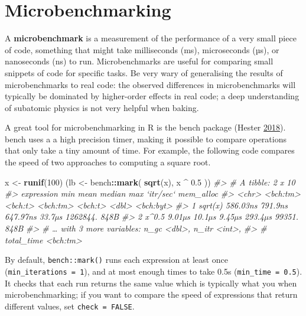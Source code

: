 \documentclass[]{book}
\newenvironment{Shaded}{\begin{snugshade}}{\end{snugshade}}
\newcommand{\CommentTok}[1]{\textcolor[rgb]{0.37,0.37,0.37}{\textit{#1}}}
\newcommand{\DecValTok}[1]{\textcolor[rgb]{0.06,0.06,0.06}{#1}}
\newcommand{\FloatTok}[1]{\textcolor[rgb]{0.06,0.06,0.06}{#1}}
\newcommand{\KeywordTok}[1]{\textcolor[rgb]{0.27,0.27,0.27}{\textbf{#1}}}
\newcommand{\NormalTok}[1]{#1}
\newcommand{\OperatorTok}[1]{\textcolor[rgb]{0.43,0.43,0.43}{\textbf{#1}}}
\newcommand{\StringTok}[1]{\textcolor[rgb]{0.5,0.5,0.5}{#1}}
\begin{document}
\hypertarget{microbenchmarking}{%
\section{Microbenchmarking}\label{microbenchmarking}}


A \textbf{microbenchmark} is a measurement of the performance of a very small piece of code, something that might take milliseconds (ms), microseconds (µs), or nanoseconds (ns) to run. Microbenchmarks are useful for comparing small snippets of code for specific tasks. Be very wary of generalising the results of microbenchmarks to real code: the observed differences in microbenchmarks will typically be dominated by higher-order effects in real code; a deep understanding of subatomic physics is not very helpful when baking.

A great tool for microbenchmarking in R is the bench package (Hester \protect\hyperlink{ref-bench}{2018}). bench uses a a high precision timer, making it possible to compare operations that only take a tiny amount of time. For example, the following code compares the speed of two approaches to computing a square root.

\begin{Shaded}
\begin{Highlighting}[]
\NormalTok{x <-}\StringTok{ }\KeywordTok{runif}\NormalTok{(}\DecValTok{100}\NormalTok{)}
\NormalTok{(lb <-}\StringTok{ }\NormalTok{bench}\OperatorTok{::}\KeywordTok{mark}\NormalTok{(}
  \KeywordTok{sqrt}\NormalTok{(x),}
\NormalTok{  x }\OperatorTok{^}\StringTok{ }\FloatTok{0.5}
\NormalTok{))}
\CommentTok{#> # A tibble: 2 x 10}
\CommentTok{#>   expression      min    mean   median     max `itr/sec` mem_alloc}
\CommentTok{#>   <chr>      <bch:tm> <bch:t> <bch:tm> <bch:t>     <dbl> <bch:byt>}
\CommentTok{#> 1 sqrt(x)    586.03ns 791.9ns 647.97ns  33.7µs  1262844.      848B}
\CommentTok{#> 2 x^0.5        9.01µs  10.1µs   9.45µs 293.4µs    99351.      848B}
\CommentTok{#> # … with 3 more variables: n_gc <dbl>, n_itr <int>,}
\CommentTok{#> #   total_time <bch:tm>}
\end{Highlighting}
\end{Shaded}

By default, \texttt{bench::mark()} runs each expression at least once (\texttt{min\_iterations\ =\ 1}), and at most enough times to take 0.5s (\texttt{min\_time\ =\ 0.5}). It checks that each run returns the same value which is typically what you when microbenchmarking; if you want to compare the speed of expressions that return different values, set \texttt{check\ =\ FALSE}.
\end{document}
